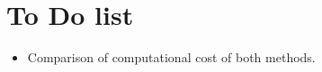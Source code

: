 \section*{To Do list}
\begin{itemize}
        \item Comparison of computational cost of both methods.
\end{itemize}

